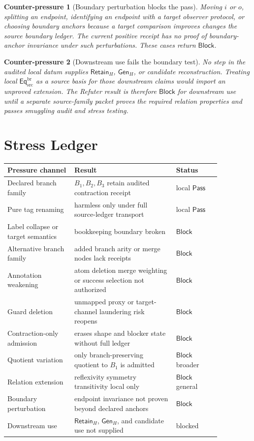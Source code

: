 \documentclass[11pt]{article}
\newcommand{\EqBr}{\mathsf{Eq}_{\mathrm{src}}^{\mathrm{br}}}
\newcommand{\RetainH}{\mathsf{Retain}_{H}}
\newcommand{\GenH}{\mathsf{Gen}_{H}}
\newcommand{\Pass}{\mathsf{Pass}}
\newcommand{\Block}{\mathsf{Block}}
\newtheorem{counterpressure}{Counter-pressure}
\begin{document}
\begin{counterpressure}[Boundary perturbation blocks the pass]
Moving \(i\) or \(o\), splitting an endpoint, identifying an endpoint
with a target observer protocol, or choosing boundary anchors because a
target comparison improves changes the source boundary ledger. The
current positive receipt has no proof of boundary-anchor invariance under
such perturbations. These cases return \(\Block\).
\end{counterpressure}

\begin{counterpressure}[Downstream use fails the boundary test]
No step in the audited local datum supplies \(\RetainH\), \(\GenH\), or
candidate reconstruction. Treating local \(\EqBr\) as a source basis for
those downstream claims would import an unproved extension. The Refuter
result is therefore \(\Block\) for downstream use until a separate
source-family packet proves the required relation properties and passes
smuggling audit and stress testing.
\end{counterpressure}

\section{Stress Ledger}

\begin{center}
\begin{tabular}{p{0.27\linewidth}p{0.41\linewidth}p{0.18\linewidth}}
\textbf{Pressure channel} & \textbf{Result} & \textbf{Status} \\
\hline
Declared branch family & \(B_{1},B_{2},B_{3}\) retain audited contraction receipt & local \(\Pass\) \\
Pure tag renaming & harmless only under full source-ledger transport & local \(\Pass\) \\
Label collapse or target semantics & bookkeeping boundary broken & \(\Block\) \\
Alternative branch family & added branch arity or merge nodes lack receipts & \(\Block\) \\
Annotation weakening & atom deletion merge weighting or success selection not authorized & \(\Block\) \\
Guard deletion & unmapped proxy or target-channel laundering risk reopens & \(\Block\) \\
Contraction-only admission & erases shape and blocker state without full ledger & \(\Block\) \\
Quotient variation & only branch-preserving quotient to \(B_{1}\) is admitted & \(\Block\) broader \\
Relation extension & reflexivity symmetry transitivity local only & \(\Block\) general \\
Boundary perturbation & endpoint invariance not proven beyond declared anchors & \(\Block\) \\
Downstream use & \(\RetainH\), \(\GenH\), and candidate use not supplied & blocked \\
\end{tabular}
\end{center}
\end{document}
